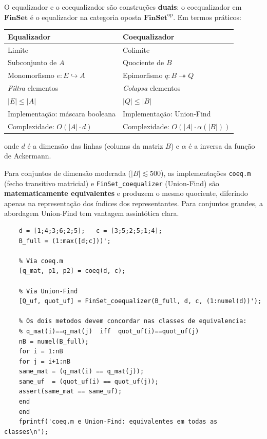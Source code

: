 \begin{proposition}
	O equalizador e o coequalizador são construções \textbf{duais}:
	o coequalizador em $\mathbf{FinSet}$ é o equalizador na categoria
	oposta $\mathbf{FinSet}^{\mathrm{op}}$. Em termos práticos:
	
	\medskip
	\begin{center}
		\begin{tabular}{ll}
			\toprule
			\textbf{Equalizador} & \textbf{Coequalizador} \\
			\midrule
			Limite & Colimite \\
			Subconjunto de $A$ & Quociente de $B$ \\
			Monomorfismo $e: E \hookrightarrow A$ & Epimorfismo $q: B \twoheadrightarrow Q$ \\
			\emph{Filtra} elementos & \emph{Colapsa} elementos \\
			$|E| \leq |A|$ & $|Q| \leq |B|$ \\
			Implementação: máscara booleana & Implementação: Union-Find \\
			Complexidade: $O(|A| \cdot d)$ & Complexidade: $O(|A| \cdot \alpha(|B|))$ \\
			\bottomrule
		\end{tabular}
	\end{center}
	\medskip
	onde $d$ é a dimensão das linhas (colunas da matriz $B$) e
	$\alpha$ é a inversa da função de Ackermann.
\end{proposition}

\begin{proposition}
	Para conjuntos de dimensão moderada ($|B| \lesssim 500$), as
	implementações \texttt{coeq.m} (fecho transitivo matricial) e
	\texttt{FinSet\_coequalizer} (Union-Find) são
	\textbf{matematicamente equivalentes} e produzem o mesmo quociente,
	diferindo apenas na representação dos índices dos representantes.
	Para conjuntos grandes, a abordagem Union-Find tem vantagem
	assintótica clara.
\end{proposition}

\begin{lstlisting}[style=matlab, caption={Verificação de equivalência entre \texttt{coeq.m} e Union-Find}]
	% Verificar que coeq.m e FinSet_coequalizer concordam
	d = [1;4;3;6;2;5];   c = [3;5;2;5;1;4];
	B_full = (1:max([d;c]))';
	
	% Via coeq.m
	[q_mat, p1, p2] = coeq(d, c);
	
	% Via Union-Find
	[Q_uf, quot_uf] = FinSet_coequalizer(B_full, d, c, (1:numel(d))');
	
	% Os dois metodos devem concordar nas classes de equivalencia:
	% q_mat(i)==q_mat(j)  iff  quot_uf(i)==quot_uf(j)
	nB = numel(B_full);
	for i = 1:nB
	for j = i+1:nB
	same_mat = (q_mat(i) == q_mat(j));
	same_uf  = (quot_uf(i) == quot_uf(j));
	assert(same_mat == same_uf);
	end
	end
	fprintf('coeq.m e Union-Find: equivalentes em todas as classes\n');
\end{lstlisting}

